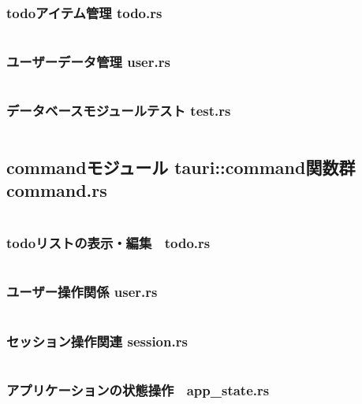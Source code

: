 \documentclass[paper=a4paper, fontsize=10pt, head_space=10mm, foot_space=17mm, gutter=17mm, line_length=185mm, twoside]{jlreq}
\begin{document}
\subsubsection{todoアイテム管理 todo.rs}
\inputminted[linenos, breaklines]{rust}{src-rs/database/todo.rs}
\clearpage

\subsubsection{ユーザーデータ管理 user.rs}
\inputminted[linenos, breaklines]{rust}{src-rs/database/user.rs}
\clearpage

\subsubsection{データベースモジュールテスト test.rs}
\inputminted[linenos, breaklines]{rust}{src-rs/database/test.rs}
\clearpage

\subsection{commandモジュール tauri::command関数群 command.rs}
\inputminted[linenos, breaklines]{rust}{src-rs/command.rs}
\clearpage

\subsubsection {todoリストの表示・編集　todo.rs}
\inputminted[linenos, breaklines]{rust}{src-rs/command/todo.rs}
\clearpage

\subsubsection {ユーザー操作関係 user.rs}
\inputminted[linenos, breaklines]{rust}{src-rs/command/user.rs}
\clearpage

\subsubsection {セッション操作関連 session.rs}
\inputminted[linenos, breaklines]{rust}{src-rs/command/session.rs}
\clearpage

\subsubsection {アプリケーションの状態操作　app\_state.rs}
\inputminted[linenos, breaklines]{rust}{src-rs/command/app_state.rs}
\clearpage
\end{document}
